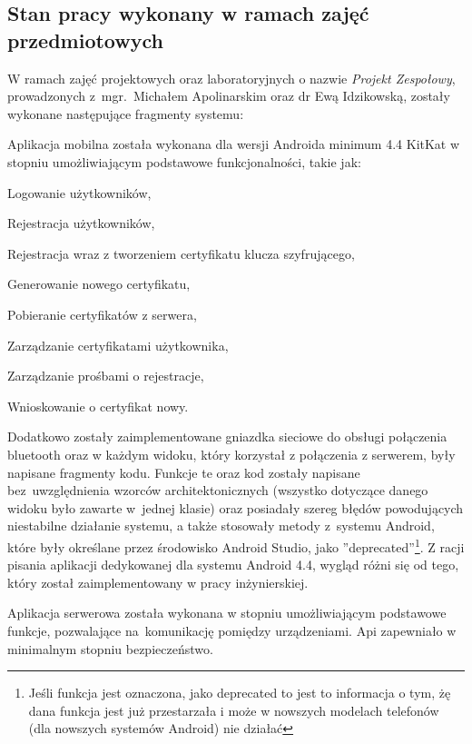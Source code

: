 \newpage
\subsection{Stan pracy wykonany w ramach zajęć przedmiotowych} \label{sec:Stan pracy wykonany w ramach zajęć przedmiotowych}
W ramach zajęć projektowych oraz laboratoryjnych o nazwie \textit{Projekt Zespołowy}, prowadzonych \linebreak z~mgr.~Michałem Apolinarskim oraz dr Ewą Idzikowską, zostały wykonane następujące fragmenty systemu:
	
	Aplikacja mobilna została wykonana dla wersji Androida minimum 4.4 KitKat w stopniu umożliwiającym podstawowe funkcjonalności, takie jak:
	\begin{itemize*}
		\item Logowanie użytkowników,
		\item Rejestracja użytkowników,
		\item Rejestracja wraz z tworzeniem certyfikatu klucza szyfrującego,
		\item Generowanie nowego certyfikatu,
		\item Pobieranie certyfikatów z serwera,
		\item Zarządzanie certyfikatami użytkownika,
		\item Zarządzanie prośbami o rejestracje,
		\item Wnioskowanie o certyfikat nowy.
	\end{itemize*}

	Dodatkowo zostały zaimplementowane gniazdka sieciowe do obsługi połączenia bluetooth oraz w każdym widoku, który korzystał z połączenia z serwerem, były napisane fragmenty kodu. Funkcje te oraz kod zostały napisane bez~uwzględnienia wzorców architektonicznych (wszystko dotyczące danego widoku było zawarte w~jednej klasie) oraz posiadały szereg błędów powodujących niestabilne działanie systemu, a także stosowały metody z~systemu Android, które były określane przez środowisko Android Studio, jako ''deprecated''\footnote{ Jeśli funkcja jest oznaczona, jako deprecated to jest to informacja o tym, żę dana funkcja jest już przestarzała i może w nowszych modelach telefonów (dla nowszych systemów Android) nie działać}. Z racji pisania aplikacji dedykowanej dla systemu Android 4.4, wygląd różni się od tego, który został zaimplementowany w pracy inżynierskiej.

   Aplikacja serwerowa została wykonana w stopniu umożliwiającym podstawowe funkcje, pozwalające na~komunikację pomiędzy urządzeniami. Api zapewniało w minimalnym stopniu bezpieczeństwo. 
   
